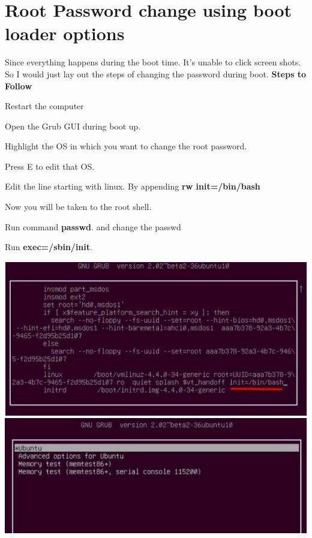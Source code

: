 \documentclass{article}
\begin{document}
\section{Root Password change using boot loader options}
Since everything happens during the boot time. It's unable to click screen shots. So I would just lay out the steps of changing the password during boot.
\newline\newline
\textbf{Steps to Follow}
\begin{steps}
\item Restart the computer
\item Open the Grub GUI during boot up.
\item Highlight the OS in which you want to change the root password.
\item Press E to edit that OS.
\item Edit the line starting with linux. By appending \textbf{rw init=/bin/bash}
\item Now you will be taken to the root shell.
\item Run command \textbf{passwd}. and change the passwd
\item Run \textbf{exec=/sbin/init}.
\newline
\begin{center}
\includegraphics[scale=1]{pass.PNG}
\newpage
\includegraphics[scale=1]{partison3.PNG}
\end{center}
\newpage
\end{steps}
\newpage
\end{document}
